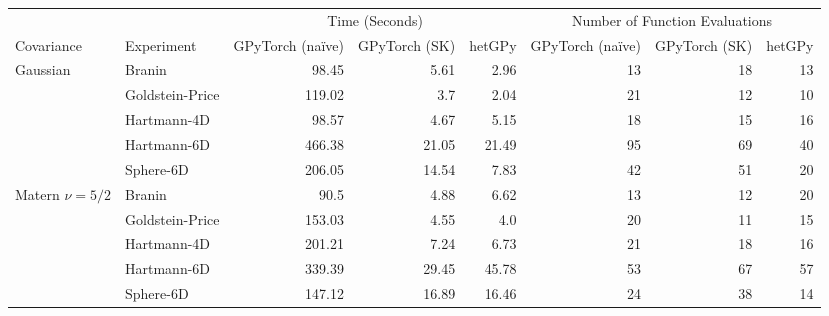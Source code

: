 \documentclass{standalone}
\begin{document}
\begin{tabular}{llrrrrrr}
\toprule
&  & \multicolumn{3}{c}{Time (Seconds)} & \multicolumn{3}{c}{Number of Function Evaluations} \\ \cmidrule(lr){3-5} \cmidrule(lr){6-8}
 Covariance & Experiment & GPyTorch (na\"ive) & GPyTorch (SK) & hetGPy & GPyTorch (na\"ive) & GPyTorch (SK) & hetGPy \\
\midrule
\multirow[t]{5}{*}{Gaussian} & Branin & 98.45 & 5.61 & 2.96 & 13 & 18 & 13 \\
 & Goldstein-Price & 119.02 & 3.7 & 2.04 & 21 & 12 & 10 \\
 & Hartmann-4D & 98.57 & 4.67 & 5.15 & 18 & 15 & 16 \\
 & Hartmann-6D & 466.38 & 21.05 & 21.49 & 95 & 69 & 40 \\
 & Sphere-6D & 206.05 & 14.54 & 7.83 & 42 & 51 & 20 \\
\cline{1-8}
\multirow[t]{5}{*}{Matern $\nu = 5/2$} & Branin & 90.5 & 4.88 & 6.62 & 13 & 12 & 20 \\
 & Goldstein-Price & 153.03 & 4.55 & 4.0 & 20 & 11 & 15 \\
 & Hartmann-4D & 201.21 & 7.24 & 6.73 & 21 & 18 & 16 \\
 & Hartmann-6D & 339.39 & 29.45 & 45.78 & 53 & 67 & 57 \\
 & Sphere-6D & 147.12 & 16.89 & 16.46 & 24 & 38 & 14 \\
\cline{1-8}
\bottomrule
\end{tabular}
\end{document}
